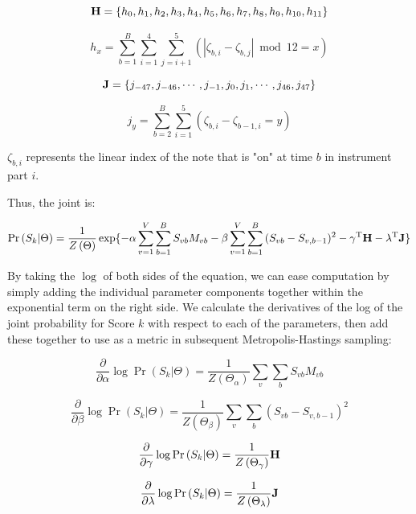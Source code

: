 \documentclass{article}
\begin{document}
\[{\bf H} = \{h_0,h_1,h_2,h_3,h_4,h_5,h_6,h_7,h_8,h_9,h_{10},h_{11}\}\]

\[h_x = \sum_{b=1}^B\sum_{i=1}^4\sum_{j=i+1}^5\left(\left|\zeta_{b,i}-\zeta_{b,j}\right|\bmod{12} = x\right)\]

\[{\bf J} = \{j_{-47},j_{-46},\cdots,j_{-1},j_0,j_1,\cdots,j_{46},j_{47}\}\]

\[j_y = \sum_{b=2}^B\sum_{i=1}^5\left(\zeta_{b,i}-\zeta_{b-1,i} = y\right)\]

$\zeta_{b,i}$ represents the linear index of the note that is "on" at time $b$ in instrument part $i$.

Thus, the joint is:

\[\Pr\left(S_k|\Theta\right) = \frac{1}{Z\left(\Theta\right)}\exp\{-\alpha\sum_{v=1}^V\sum_{b=1}^B{S_{vb}M_{vb}}- \beta\sum_{v=1}^V\sum_{b=1}^B{(S_{vb}-S_{v,b-1})^2} - \gamma^\mathrm{T}{\bf H} - \lambda^\mathrm{T}{\bf J}\}\]

By taking the $\log$ of both sides of the equation, we can ease computation by simply adding the individual parameter components together within the exponential term on the right side.  We calculate the derivatives of the log of the joint probability for Score $k$ with respect to each of the parameters, then add these together to use as a metric in subsequent Metropolis-Hastings sampling:


\[\frac{\partial}{\partial\alpha}\log{\Pr\left(S_k|\Theta\right)} = \frac{1}{Z\left(\Theta_\alpha\right)}\sum_v\sum_b{S_{vb}M_{vb}}\]

\[\frac{\partial}{\partial\beta}\log{\Pr\left(S_k|\Theta\right)} = \frac{1}{Z\left(\Theta_\beta\right)}\sum_v\sum_b{(S_{vb}-S_{v,b-1})^2}\]

\[\frac{\partial}{\partial\gamma}\log{\Pr\left(S_k|\Theta\right)} = \frac{1}{Z\left(\Theta_\gamma\right)}{\bf H}\]

\[\frac{\partial}{\partial\lambda}\log{\Pr\left(S_k|\Theta\right)} = \frac{1}{Z\left(\Theta_\lambda\right)}{\bf J}\]


\end{document}
